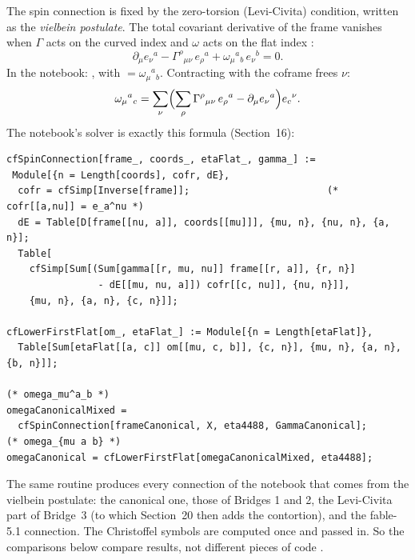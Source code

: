 The spin connection is fixed by the zero-torsion (Levi-Civita) condition, written as the
\emph{vielbein postulate}. The total covariant derivative of the frame vanishes when $\Gamma$ acts
on the curved index and $\omega$ acts on the flat index :
\begin{equation}
  \partial_\mu e_\nu{}^a-\Gamma^\rho{}_{\mu\nu}\,e_\rho{}^a+\omega_\mu{}^a{}_b\,e_\nu{}^b=0 .
\end{equation}
In the notebook: ,
with  $=\omega_\mu{}^a{}_b$. Contracting with the coframe frees $\nu$:
\begin{equation}
  \omega_\mu{}^a{}_c=\sum_\nu\Bigl(\sum_\rho\Gamma^\rho{}_{\mu\nu}\,e_\rho{}^a-\partial_\mu e_\nu{}^a\Bigr)e_c{}^\nu .
\end{equation}
The notebook's solver is exactly this formula (Section~16):

{\scriptsize
\begin{verbatim}
cfSpinConnection[frame_, coords_, etaFlat_, gamma_] :=
 Module[{n = Length[coords], cofr, dE},
  cofr = cfSimp[Inverse[frame]];                        (* cofr[[a,nu]] = e_a^nu *)
  dE = Table[D[frame[[nu, a]], coords[[mu]]], {mu, n}, {nu, n}, {a, n}];
  Table[
    cfSimp[Sum[(Sum[gamma[[r, mu, nu]] frame[[r, a]], {r, n}]
                - dE[[mu, nu, a]]) cofr[[c, nu]], {nu, n}]],
    {mu, n}, {a, n}, {c, n}]];

cfLowerFirstFlat[om_, etaFlat_] := Module[{n = Length[etaFlat]},
  Table[Sum[etaFlat[[a, c]] om[[mu, c, b]], {c, n}], {mu, n}, {a, n}, {b, n}]];

(* omega_mu^a_b *)
omegaCanonicalMixed =
  cfSpinConnection[frameCanonical, X, eta4488, GammaCanonical];
(* omega_{mu a b} *)
omegaCanonical = cfLowerFirstFlat[omegaCanonicalMixed, eta4488];
\end{verbatim}
}

The same routine produces every connection of the notebook that comes from the vielbein
postulate: the canonical one, those of Bridges 1 and 2, the Levi-Civita part  of
Bridge~3 (to which Section~20 then adds the contortion), and the fable-5.1 connection. The
Christoffel symbols are computed once and passed in. So the comparisons below compare results, not
different pieces of code .

